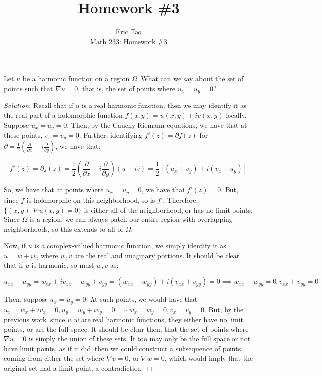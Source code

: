 \documentclass[10pt]{article}
\newenvironment{problem}[2][]{\begin{trivlist}
\item[\hskip \labelsep {\bfseries #1}\hskip \labelsep {\bfseries #2.}]}{\end{trivlist}}
\begin{document}
 
\title{Homework \#3}
\author{Eric Tao\\
Math 233: Homework \#3}
\maketitle

\begin{problem}{Question 1}

Let $u$ be a harmonic function on a region $\Omega$. What can we say about the set of points such that $\nabla u = 0$, that is, the set of points where $u_x = u_y = 0$?

\end{problem}
\begin{proof}[Solution]

Recall that if $u$ is a real harmonic function, then we may identify it as the real part of a holomorphic function $f(x,y) = u(x,y) + i v(x,y)$ locally. Suppose $u_x = u_y = 0$. Then, by the Cauchy-Riemann equations, we have that at these points, $v_x = v_y = 0$. Further, identifying $f'(z) = \partial f(z)$ for $\partial = \frac{1}{2}\left( \frac{\partial}{\partial x} - i \frac{\partial}{\partial y} \right)$, we have that:

$$ f'(z) = \partial f(z) = \frac{1}{2}\left( \frac{\partial}{\partial x} - i \frac{\partial}{\partial y} \right) (u + iv) = \frac{1}{2} \left[ (u_x+ v_y) + i(v_x - u_y) \right]$$

So, we have that at points where $u_x = u_y = 0$, we have that $f'(z) = 0$. But, since $f$ is holomorphic on this neighborhood, so is $f'$. Therefore, $\{ (x,y) : \nabla u(x,y) = 0 \}$ is either all of the neighborhood, or has no limit points. Since $\Omega$ is a region, we can always patch our entire region with overlapping neighborhoods, so this extends to all of $\Omega$.

Now, if $u$ is a complex-valued harmonic function, we simply identify it as $u = w + iv$, where $w, v$ are the real and imaginary portions. It should be clear that if $u$ is harmonic, so must $w,v$ as:

$$u_{xx} + u_{yy} = w_{xx} + i v_{xx} + w_{yy} + v_{yy} = (w_{xx}+ w_{yy}) + i (v_{xx} + v_{yy}) = 0 \implies w_{xx}+ w_{yy} = 0, v_{xx} + v_{yy} = 0 $$

Then, suppose $u_x = u_y = 0$. At such points, we would have that $u_x = w_x + i v_x = 0, u_y = w_y + i v_y = 0 \implies w_x = w_y = 0, v_x = v_y = 0$. But, by the previous work, since $v,w$ are real harmonic functions, they either have no limit points, or are the full space. It should be clear then, that the set of points where $\nabla u = 0$ is simply the union of these sets. It too may only be the full space or not have limit points, as if it did, then we could construct a subsequence of points coming from either the set where $\nabla v = 0$, or  $\nabla w = 0$, which would imply that the original set had a limit point, a contradiction.
\end{proof}
\end{document}
